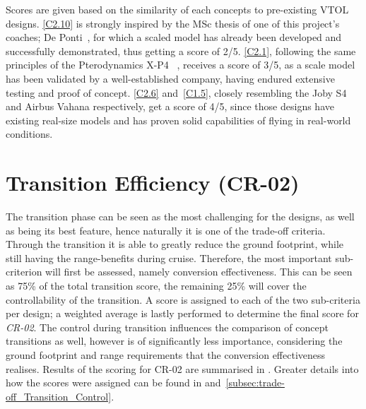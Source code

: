Scores are given based on the similarity of each concepts to pre-existing VTOL designs. 
\ref{C2.10} is strongly inspired by the MSc thesis of one of this project's coaches; De Ponti~\cite{ThesisVSQP}, for which a scaled model has already been developed and successfully demonstrated, thus getting a score of 2/5. 
\ref{C2.1}, following the same principles of the Pterodynamics X-P4 ~\cite{pterodynamics_site}, receives a score of 3/5, as a scale model has been validated by a well-established company, having endured extensive testing and proof of concept. 
\ref{C2.6} and~\ref{C1.5}, closely resembling the Joby S4 \cite{jobyaviation} and Airbus Vahana \cite{vahana} respectively, get a score of 4/5, since those designs have existing real-size models and has proven solid capabilities of flying in real-world conditions.


\section{Transition Efficiency (CR-02)}
\label{sec:trade-off_Transition}
The transition phase can be seen as the most challenging for the designs, as well as being its best feature, hence naturally it is one of the trade-off criteria.
Through the transition it is able to greatly reduce the ground footprint, while still having the range-benefits during cruise.
Therefore, the most important sub-criterion will first be assessed, namely conversion effectiveness.
This can be seen as 75\% of the total transition score, the remaining 25\% will cover the controllability of the transition.
A score is assigned to each of the two sub-criteria per design; a weighted average is lastly performed to determine the final score for \textit{CR-02}.
The control during transition influences the comparison of concept transitions as well, however is of significantly less importance, considering the ground footprint and range requirements that the conversion effectiveness realises.
Results of the scoring for CR-02 are summarised in .
Greater details into how the scores were assigned can be found in  and~\ref{subsec:trade-off_Transition_Control}.

